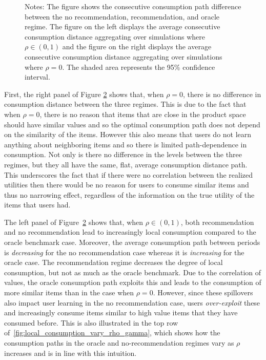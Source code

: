 \documentclass[manuscript, nonacm]{acmart}
\begin{document}
{\begin{figure}[t]
\begin{subfigure}{.3\linewidth}
  \label{fig:sfig2}
\end{subfigure}
\caption*{\scriptsize Notes: The figure shows the consecutive consumption path difference between the no recommendation, recommendation, and oracle regime. The figure on the left displays the average consecutive consumption distance aggregating over simulations where $\rho \in (0,1)$ and the figure on the right displays the average consecutive consumption distance aggregating over simulations where $\rho = 0$. The shaded area represents the 95\% confidence interval.}
\label{fig:correlation_consumption_path}
\end{figure}
\addtocounter{figure}{-1}}

First, the right panel of Figure \ref{fig:correlation_consumption_path} shows that, when $\rho = 0$, there is no difference in consumption distance between the three regimes. This is due to the fact that when $\rho = 0$, there is no reason that items that are close in the product space should have similar values and so the optimal consumption path does not depend on the similarity of the items. However this also means that users do not learn anything about neighboring items and so there is limited path-dependence in consumption. Not only is there no difference in the levels between the three regimes, but they all have the same, flat, average consumption distance path. This underscores the fact that if there were no correlation between the realized utilities then there would be no reason for users to consume similar items and thus no narrowing effect, regardless of the information on the true utility of the items that users had.
\par
The left panel of Figure~\ref{fig:correlation_consumption_path} shows that, when $\rho \in (0,1)$, both recommendation and no recommendation lead to increasingly local consumption compared to the oracle benchmark case. Moreover, the average consumption path between periods is \textit{decreasing} for the no recommendation case whereas it is \textit{increasing} for the oracle case. The recommendation regime decreases the degree of local consumption, but not as much as the oracle benchmark. Due to the correlation of values, the oracle consumption path exploits this and leads to the consumption of more similar items than in the case when $\rho = 0$. However, since these spillovers also impact user learning in the no recommendation case, users \textit{over-exploit} these and increasingly consume items similar to high value items that they have consumed before. This is also illustrated in the top row of~\autoref{fig:local_consumption_vary_rho_gamma}, which shows how the consumption paths in the oracle and no-recommendation regimes vary as $\rho$ increases and is in line with this intuition.
\end{document}
